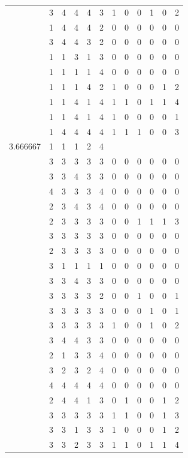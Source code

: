 \documentclass[]{book}
\theoremstyle{definition}
\theoremstyle{definition}
\theoremstyle{definition}
\theoremstyle{remark}
\begin{document}
\begin{table}
{\begin{tabular}[t]{rrrrrrrrrrrr}
 & 3 & 4 & 4 & 4 & 3 & 1 & 0 & 0 & 1 & 0 & 2\\
 & 1 & 4 & 4 & 4 & 2 & 0 & 0 & 0 & 0 & 0 & 0\\
 & 3 & 4 & 4 & 3 & 2 & 0 & 0 & 0 & 0 & 0 & 0\\
 & 1 & 1 & 3 & 1 & 3 & 0 & 0 & 0 & 0 & 0 & 0\\
 & 1 & 1 & 1 & 1 & 4 & 0 & 0 & 0 & 0 & 0 & 0\\
 & 1 & 1 & 1 & 4 & 2 & 1 & 0 & 0 & 0 & 1 & 2\\
 & 1 & 1 & 4 & 1 & 4 & 1 & 1 & 0 & 1 & 1 & 4\\
 & 1 & 1 & 4 & 1 & 4 & 1 & 0 & 0 & 0 & 0 & 1\\
 & 1 & 4 & 4 & 4 & 4 & 1 & 1 & 1 & 0 & 0 & 3\\
3.666667 & 1 & 1 & 1 & 2 & 4 &  &  &  &  &  & \\
 & 3 & 3 & 3 & 3 & 3 & 0 & 0 & 0 & 0 & 0 & 0\\
 & 3 & 3 & 4 & 3 & 3 & 0 & 0 & 0 & 0 & 0 & 0\\
 & 4 & 3 & 3 & 3 & 4 & 0 & 0 & 0 & 0 & 0 & 0\\
 & 2 & 3 & 4 & 3 & 4 & 0 & 0 & 0 & 0 & 0 & 0\\
 & 2 & 3 & 3 & 3 & 3 & 0 & 0 & 1 & 1 & 1 & 3\\
 & 3 & 3 & 3 & 3 & 3 & 0 & 0 & 0 & 0 & 0 & 0\\
 & 2 & 3 & 3 & 3 & 3 & 0 & 0 & 0 & 0 & 0 & 0\\
 & 3 & 1 & 1 & 1 & 1 & 0 & 0 & 0 & 0 & 0 & 0\\
 & 3 & 3 & 4 & 3 & 3 & 0 & 0 & 0 & 0 & 0 & 0\\
 & 3 & 3 & 3 & 3 & 2 & 0 & 0 & 1 & 0 & 0 & 1\\
 & 3 & 3 & 3 & 3 & 3 & 0 & 0 & 0 & 1 & 0 & 1\\
 & 3 & 3 & 3 & 3 & 3 & 1 & 0 & 0 & 1 & 0 & 2\\
 & 3 & 4 & 4 & 3 & 3 & 0 & 0 & 0 & 0 & 0 & 0\\
 & 2 & 1 & 3 & 3 & 4 & 0 & 0 & 0 & 0 & 0 & 0\\
 & 3 & 2 & 3 & 2 & 4 & 0 & 0 & 0 & 0 & 0 & 0\\
 & 4 & 4 & 4 & 4 & 4 & 0 & 0 & 0 & 0 & 0 & 0\\
 & 2 & 4 & 4 & 1 & 3 & 0 & 1 & 0 & 0 & 1 & 2\\
 & 3 & 3 & 3 & 3 & 3 & 1 & 1 & 0 & 0 & 1 & 3\\
 & 3 & 3 & 1 & 3 & 3 & 1 & 0 & 0 & 0 & 1 & 2\\
 & 3 & 3 & 2 & 3 & 3 & 1 & 1 & 0 & 1 & 1 & 4\\

\end{tabular}}
\end{table}
\end{document}
